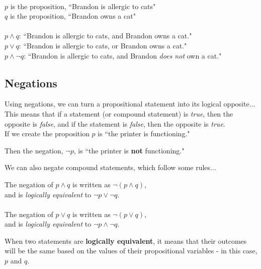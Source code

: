 \documentclass[../RachelNotes.tex]{subfiles}
\begin{document}
        \begin{mdframed}
            ~\\
            $p$ is the proposition, ``Brandon is allergic to cats" \\
            $q$ is the proposition, ``Brandon owns a cat" ~\\ ~\\
            $p \land q$: ``Brandon is allergic to cats, and Brandon owns a cat." \\
            $p \lor q$: ``Brandon is allergic to cats, or Brandon owns a cat." \\
            $p \land \neg q$: ``Brandon is allergic to cats, and Brandon \textit{does not} own a cat."
        \end{mdframed}



        \subsection{Negations}
        
        Using negations, we can turn a propositional statement into its
        logical opposite... This means that if a statement (or compound statement)
        is \textit{true}, then the opposite is \textit{false}, and if the
        statement is \textit{false}, then the opposite is \textit{true}. \\

        If we create the proposition
        $p$ is ``the printer is functioning."

        Then the negation, $\neg p$, is ``the printer is \textbf{not} functioning."

        We can also negate compound statements, which follow some rules...

        \begin{center}
            The negation of $p \land q$ is written as $\neg(p \land q)$, \\
                and is \textit{logically equivalent} to $\neg p \lor \neg q$. ~\\ ~\\

            The negation of $p \lor q$ is written as $\neg(p \lor q)$, \\
                and is \textit{logically equivalent} to $\neg p \land \neg q$.
        \end{center}

        When two statements are \textbf{logically equivalent}, it means that
        their outcomes will be the same based on the values of their
        propositional variables - in this case, $p$ and $q$.
\end{document}
